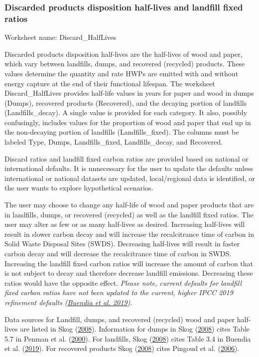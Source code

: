 \documentclass[
  openany]{book}
\begin{document}
\hypertarget{own-prov-input-discHL}{%
\subsubsection{Discarded products disposition half-lives and landfill
fixed ratios}\label{own-prov-input-discHL}}

Worksheet name: Discard\_HalfLives

Discarded products disposition half-lives are the half-lives of wood and
paper, which vary between landfills, dumps, and recovered (recycled)
products. These values determine the quantity and rate HWPs are emitted
with and without energy capture at the end of their functional lifespan.
The worksheet Discard\_HalfLives provides half-life values in years for
paper and wood in dumps (Dumps), recovered products (Recovered), and the
decaying portion of landfills (Landfills\_decay). A single value is
provided for each category. It also, possibly confusingly, includes
values for the proportion of wood and paper that end up in the
non-decaying portion of landfills (Landfills\_fixed). The columns must
be labeled Type, Dumps, Landfills\_fixed, Landfills\_decay, and
Recovered.

Discard ratios and landfill fixed carbon ratios are provided based on
national or international defaults. It is unnecessary for the user to
update the defaults unless international or national datasets are
updated, local/regional data is identified, or the user wants to explore
hypothetical scenarios.

The user may choose to change any half-life of wood and paper products
that are in landfills, dumps, or recovered (recycled) as well as the
landfill fixed ratios. The user may alter as few or as many half-lives
as desired. Increasing half-lives will result in slower carbon decay and
will increase the recalcitrance time of carbon in Solid Waste Disposal
Sites (SWDS). Decreasing half-lives will result in faster carbon decay
and will decrease the recalcitrance time of carbon in SWDS. Increasing
the landfill fixed carbon ratios will increase the amount of carbon that
is not subject to decay and therefore decrease landfill emissions.
Decreasing these ratios would have the opposite effect. \emph{Please
note, current defaults for landfill fixed carbon ratios have not been
updated to the current, higher IPCC 2019 refinement defaults
(\protect\hyperlink{ref-buendia2019}{Buendia et al. 2019}).}

Data sources for Landfill, dumps, and recovered (recycled) wood and
paper half-lives are listed in Skog
(\protect\hyperlink{ref-skog2008}{2008}). Information for dumps in Skog
(\protect\hyperlink{ref-skog2008}{2008}) cites Table 5.7 in Penman et
al. (\protect\hyperlink{ref-penman2000}{2000}). For landfills, Skog
(\protect\hyperlink{ref-skog2008}{2008}) cites Table 3.4 in Buendia et
al. (\protect\hyperlink{ref-buendia2019}{2019}). For recovered products
Skog (\protect\hyperlink{ref-skog2008}{2008}) cites Pingoud et al.
(\protect\hyperlink{ref-pingoud2006}{2006}).
\end{document}
